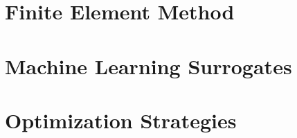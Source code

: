 
\section{Finite Element Method}

\section{Machine Learning Surrogates}
\label{subsec:ml_surrogates}

\section{Optimization Strategies}
\label{subsec:optimization_strategies}

